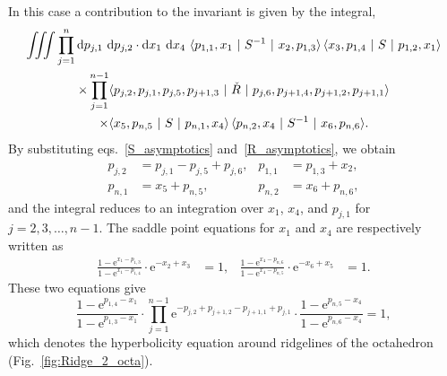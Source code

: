 \documentclass[12pt]{article}
\numberwithin{equation}{section}
\begin{document}
In this case a contribution to the invariant is given by the integral,
\begin{multline}
  \iiint \prod_{j=1}^n \mathrm{d} p_{j,1} \ \mathrm{d} p_{j,2} \cdot
  \mathrm{d} x_1 \ \mathrm{d} x_4 \
  \langle p_{1,1} , x_1 \  | \  S^{-1} \  | \ x_2 , p_{1,3} \rangle \,
  \langle x_3 , p_{1,4} \ | \  S \  | \ p_{1,2} , x_1 \rangle
  \\
  \times
  \prod_{j=1}^{n-1}
  \langle p_{j,2} , p_{j,1} , p_{j,5}, p_{j+1,3} \  | \
  \Check{R}  \ | \
  p_{j,6} , p_{j+1,4}, p_{j+1,2} , p_{j+1,1} \rangle
  \\
  \times
  \langle x_5 , p_{n,5} \  | \  S \ | \  p_{n,1} , x_4 \rangle \,
  \langle p_{n,2} , x_4 \ | \ S^{-1} \  | \  x_6 , p_{n,6} \rangle .
\end{multline}
By substituting eqs.~\eqref{S_asymptotics} and~\eqref{R_asymptotics}, 
we obtain
\begin{align*}
  p_{j,2} & = p_{j,1} - p_{j,5} + p_{j,6} ,
  &
  p_{1,1} & = p_{1,3} + x_2 ,
  \\[2mm]
%
  p_{n,1} & = x_5 + p_{n,5},
  &
  p_{n,2} &= x_6 + p_{n,6} ,
\end{align*}
and the integral reduces to an integration over
$x_1$, $x_4$, and $p_{j,1}$ for
$j=2, 3, \dots, n-1$.
The saddle point equations for $x_1$ and $x_4$ are respectively
written as
\begin{align*}
  \frac{1 - \mathrm{e}^{x_1 - p_{1,3}}}
  {1 - \mathrm{e}^{x_1 -  p_{1,4}}}
  \cdot
  \mathrm{e}^{-x_2 + x_3}
  & = 1 ,
%
  &
%
  \frac{1 - \mathrm{e}^{x_4 - p_{n,6}}}
  {1 - \mathrm{e}^{x_4 - p_{n,5}}}
  \cdot
  \mathrm{e}^{- x_6 + x_5}
  &  = 1 .
\end{align*}
These two equations give
\begin{equation}
  \label{condition_ridge_2_octa}
  \frac{
    1 - \mathrm{e}^{p_{1,4} - x_1}
    }{
    1 - \mathrm{e}^{p_{1,3} - x_1}
    } \cdot
  \prod_{j=1}^{n-1}
  \mathrm{e}^{-p_{j,2} + p_{j+1,2} - p_{j+1,1} + p_{j,1}}
  \cdot
  \frac{
    1 - \mathrm{e}^{p_{n,5} - x_4}
    }{
    1 - \mathrm{e}^{p_{n,6} - x_4}
    }
  = 1 ,
\end{equation}
which denotes the hyperbolicity equation around  ridgelines of the
octahedron
(Fig.~\ref{fig:Ridge_2_octa}).
\end{document}
